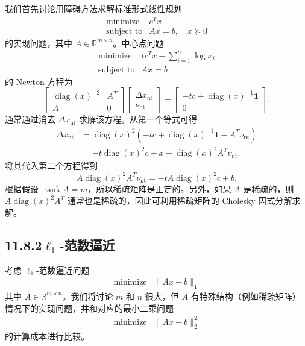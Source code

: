 \documentclass[UTF8, 12pt, fontset=fandol, oneside]{ctexart}
\begin{document}
我们首先讨论用障碍方法求解标准形式线性规划
\[
\begin{array}{ll}
\text{minimize} & c^Tx\\
\text{subject to} & Ax=b,\quad x\succeq 0
\end{array}
\]
的实现问题，其中 $A\in\mathbb{R}^{m\times n}$。中心点问题
\[
\begin{array}{ll}
\text{minimize} & tc^Tx-\displaystyle\sum_{i=1}^n\log x_i\\
\text{subject to} & Ax=b
\end{array}
\]
的 Newton 方程为
\[
\begin{bmatrix}
\operatorname{diag}(x)^{-2} & A^T\\
A & 0
\end{bmatrix}
\begin{bmatrix}
\Delta x_{\mathrm{nt}}\\
\nu_{\mathrm{nt}}
\end{bmatrix}
=
\begin{bmatrix}
-tc+\operatorname{diag}(x)^{-1}\mathbf{1}\\
0
\end{bmatrix}.
\]
通常通过消去 $\Delta x_{\mathrm{nt}}$ 求解该方程。从第一个等式可得
\[
\begin{aligned}
\Delta x_{\mathrm{nt}}
&=\operatorname{diag}(x)^2(-tc+\operatorname{diag}(x)^{-1}\mathbf{1}-A^T\nu_{\mathrm{nt}})\\
&=-t\operatorname{diag}(x)^2c+x-\operatorname{diag}(x)^2A^T\nu_{\mathrm{nt}}.
\end{aligned}
\]
将其代入第二个方程得到
\[
A\operatorname{diag}(x)^2A^T\nu_{\mathrm{nt}}
=-tA\operatorname{diag}(x)^2c+b.
\]
根据假设 $\operatorname{rank}A=m$，所以稀疏矩阵是正定的。另外，如果 $A$ 是稀疏的，则 $A\operatorname{diag}(x)^2A^T$ 通常也是稀疏的，因此可利用稀疏矩阵的 Cholesky 因式分解求解。

\subsection*{11.8.2\quad $\ell_1$-范数逼近}

考虑 $\ell_1$-范数逼近问题
\[
\begin{array}{ll}
\text{minimize} & \|Ax-b\|_1
\end{array}
\]
其中 $A\in\mathbb{R}^{m\times n}$。我们将讨论 $m$ 和 $n$ 很大，但 $A$ 有特殊结构（例如稀疏矩阵）情况下的实现问题，并和对应的最小二乘问题
\[
\begin{array}{ll}
\text{minimize} & \|Ax-b\|_2^2
\end{array}
\]
的计算成本进行比较。
\end{document}
